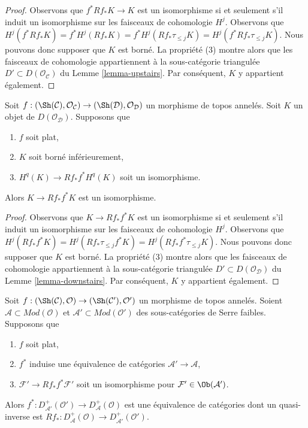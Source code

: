 \begin{proof}
Observons que $f^*Rf_*K \to K$ est un isomorphisme si et seulement s'il
induit un isomorphisme sur les faisceaux de cohomologie $H^j$. Observons
que
$H^j(f^*Rf_*K) = f^*H^j(Rf_*K) = f^*H^j(Rf_*\tau_{\leq j}K) =
H^j(f^*Rf_*\tau_{\leq j}K)$.
Nous pouvons donc supposer que $K$ est borné. La propriété (3) montre alors
que les faisceaux de cohomologie appartiennent à la sous-catégorie
triangulée $D' \subset D(\mathcal{O}_\mathcal{C})$ du Lemme
\ref{lemma-upstairs}. Par conséquent, $K$ y appartient également.
\end{proof}

\begin{lemma}
\label{lemma-bounded-in-image-downstairs}
Soit $f : (\Sh(\mathcal{C}), \mathcal{O}_\mathcal{C}) \to
(\Sh(\mathcal{D}), \mathcal{O}_\mathcal{D})$ un morphisme de topos annelés.
Soit $K$ un objet de $D(\mathcal{O}_\mathcal{D})$. Supposons que
\begin{enumerate}
\item $f$ soit plat,
\item $K$ soit borné inférieurement,
\item $H^q(K) \to Rf_*f^*H^q(K)$ soit un isomorphisme.
\end{enumerate}
Alors $K \to Rf_*f^*K$ est un isomorphisme.
\end{lemma}

\begin{proof}
Observons que $K \to Rf_*f^*K$ est un isomorphisme si et seulement s'il
induit un isomorphisme sur les faisceaux de cohomologie $H^j$. Observons
que
$H^j(Rf_*f^*K) = H^j(Rf_*\tau_{\leq j}f^*K) = H^j(Rf_*f^*\tau_{\leq j}K)$.
Nous pouvons donc supposer que $K$ est borné. La propriété (3) montre alors
que les faisceaux de cohomologie appartiennent à la sous-catégorie
triangulée $D' \subset D(\mathcal{O}_\mathcal{D})$ du Lemme
\ref{lemma-downstairs}. Par conséquent, $K$ y appartient également.
\end{proof}

\begin{lemma}
\label{lemma-equivalence-bounded}
Soit $f : (\Sh(\mathcal{C}), \mathcal{O}) \to (\Sh(\mathcal{C}'), \mathcal{O}')$
un morphisme de topos annelés. Soient
$\mathcal{A} \subset \textit{Mod}(\mathcal{O})$ et
$\mathcal{A}' \subset \textit{Mod}(\mathcal{O}')$ des sous-catégories de
Serre faibles. Supposons que
\begin{enumerate}
\item $f$ soit plat,
\item $f^*$ induise une équivalence de catégories
$\mathcal{A}' \to \mathcal{A}$,
\item $\mathcal{F}' \to Rf_*f^*\mathcal{F}'$ soit un isomorphisme pour
$\mathcal{F}' \in \Ob(\mathcal{A}')$.
\end{enumerate}
Alors
$f^* : D_{\mathcal{A}'}^+(\mathcal{O}') \to D_\mathcal{A}^+(\mathcal{O})$
est une équivalence de catégories dont un quasi-inverse est
$Rf_* : D_\mathcal{A}^+(\mathcal{O}) \to D_{\mathcal{A}'}^+(\mathcal{O}')$.
\end{lemma}

